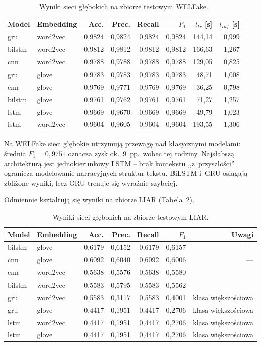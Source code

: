 \documentclass[oneside,polski,logo]{amuthesis}
\begin{document}
\begin{table}[ht]
\centering
\caption{Wyniki sieci głębokich na zbiorze testowym WELFake.}
\label{tab:dl_welfake}
\begin{tabular}{llrrrrrr}
\toprule
Model & Embedding & Acc. & Prec. & Recall & $F_1$ & $t_{tr}$ [s] & $t_{inf}$ [s] \\
\midrule
gru    & word2vec & 0,9824 & 0,9824 & 0,9824 & 0,9824 & 144,14 & 0,999 \\
bilstm & word2vec & 0,9812 & 0,9812 & 0,9812 & 0,9812 & 166,63 & 1,267 \\
cnn    & word2vec & 0,9788 & 0,9788 & 0,9788 & 0,9788 & 129,05 & 0,825 \\
gru    & glove    & 0,9783 & 0,9783 & 0,9783 & 0,9783 & 48,71  & 1,008 \\
cnn    & glove    & 0,9769 & 0,9771 & 0,9769 & 0,9769 & 36,25  & 0,798 \\
bilstm & glove    & 0,9761 & 0,9762 & 0,9761 & 0,9761 & 71,27  & 1,257 \\
lstm   & glove    & 0,9669 & 0,9670 & 0,9669 & 0,9669 & 49,79  & 1,023 \\
lstm   & word2vec & 0,9604 & 0,9605 & 0,9604 & 0,9604 & 193,55 & 1,306 \\
\bottomrule
\end{tabular}
\end{table}

Na WELFake sieci głębokie utrzymują przewagę nad klasycznymi modelami:
średnia \(F_1 = 0{,}9751\) oznacza zysk ok.\ 9~pp.\ wobec tej rodziny.
Najsłabszą architekturą jest jednokierunkowy LSTM -- brak kontekstu
,,z~przyszłości'' ogranicza modelowanie narracyjnych struktur tekstu.
BiLSTM i~GRU osiągają zbliżone wyniki, lecz GRU trenuje się wyraźnie
szybciej.

Odmiennie kształtują się wyniki na zbiorze LIAR (Tabela~\ref{tab:dl_liar}).

\begin{table}[ht]
\centering
\caption{Wyniki sieci głębokich na zbiorze testowym LIAR.}
\label{tab:dl_liar}
\begin{tabular}{llrrrrr}
\toprule
Model & Embedding & Acc. & Prec. & Recall & $F_1$ & Uwagi \\
\midrule
bilstm & glove    & 0,6179 & 0,6152 & 0,6179 & 0,6157 & --- \\
cnn    & glove    & 0,6092 & 0,6040 & 0,6092 & 0,6006 & --- \\
cnn    & word2vec & 0,5638 & 0,5576 & 0,5638 & 0,5580 & --- \\
bilstm & word2vec & 0,5583 & 0,5795 & 0,5583 & 0,5562 & --- \\
gru    & word2vec & 0,5583 & 0,3117 & 0,5583 & 0,4001 & klasa większościowa \\
gru    & glove    & 0,4417 & 0,1951 & 0,4417 & 0,2706 & klasa większościowa \\
lstm   & word2vec & 0,4417 & 0,1951 & 0,4417 & 0,2706 & klasa większościowa \\
lstm   & glove    & 0,4417 & 0,1951 & 0,4417 & 0,2706 & klasa większościowa \\
\bottomrule
\end{tabular}
\end{table}
\end{document}
